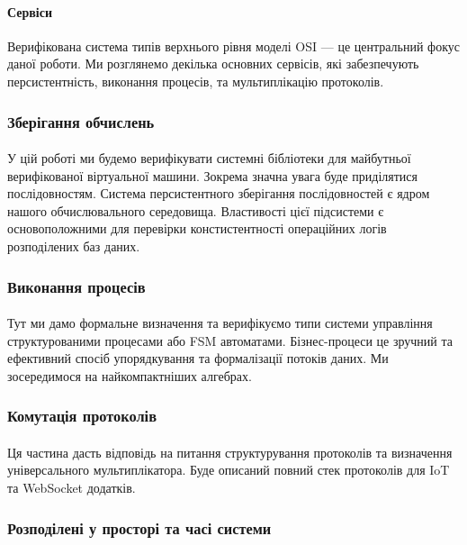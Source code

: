 \documentclass[11pt,oneside]{article}
\begin{document}
   \paragraph{\bf Сервіси}
   Верифікована система типів верхнього рівня моделі OSI --- це центральний фокус даної роботи.
   Ми розглянемо декілька основних сервісів, які забезпечують персистентність, виконання процесів,
   та мультиплікацію протоколів.

   \newpage

\subsubsection{Зберігання обчислень}
   \paragraph{}
   У цій роботі ми будемо верифікувати системні бібліотеки для
   майбутньої верифікованої віртуальної машини. Зокрема значна увага буде приділятися
   послідовностям. Система персистентного зберігання послідовностей є ядром нашого
   обчислювального середовища. Властивості цієї підсистеми є основоположними
   для перевірки констистентності операційних логів розподілених баз даних.


\subsubsection{Виконання процесів}
   \paragraph{}
   Тут ми дамо формальне визначення та верифікуємо
   типи системи управління структурованими процесами або FSM автоматами.
   Бізнес-процеси це зручний та ефективний спосіб упорядкування та формалізації
   потоків даних. Ми зосередимося на найкомпактніших алгебрах.

\subsubsection{Комутація протоколів}
   \paragraph{}
   Ця частина дасть відповідь на питання структурування
   протоколів та визначення універсального мультиплікатора. Буде описаний повний стек
   протоколів для IoT та WebSocket додатків.

\subsubsection{Розподілені у просторі та часі системи}
\end{document}
